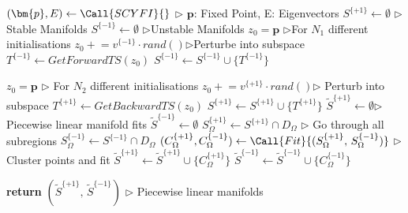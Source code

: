 \documentclass{article}
\theoremstyle{example}
\theoremstyle{plain}
\theoremstyle{definition}
\theoremstyle{remark}
\begin{document}
\begin{algorithm}[h]
\caption{Finding stable/unstable manifolds: fallback algorithm}
\label{alg:fallback}
\begin{algorithmic}[1]
    \State $(\bm{p}, E) \gets \Call{SCYFI}{}$ \hfill $\triangleright$ $\bm{p}$: Fixed Point, E: Eigenvectors
    \State $S^{\{+1\}} \gets \emptyset$ \hfill $\triangleright$Stable Manifolds
    \State $S^{\{-1\}} \gets \emptyset$ \hfill $\triangleright$Unstable Manifolds
    \State $z_0 = \bm{p}$ \hfill $\triangleright$For $N_1$ different initialisations
        \State $z_0 \mathrel{+}= v^{\{-1\}} \cdot rand()$\hfill $\triangleright$Perturbe into subspace
    \EndFor
        \State $T^{\{-1\}} \gets \textit{GetForwardTS}(z_0 )$
        \State $S^{\{-1\}} \gets S^{\{-1\}} \cup \{ T^{\{-1\}} \}$
   
    \EndFor
      \State $z_0 = \bm{p}$ \hfill $\triangleright$ For $N_2$ different initialisations
        \State $z_0 \mathrel{+}= v^{\{+1\}} \cdot rand()$\hfill $\triangleright$ Perturb into subspace
    \EndFor
        \State $T^{\{+1\}} \gets \textit{}{GetBackwardTS}(z_0)$
        \State $S^{\{+1\}} \gets S^{\{+1\}} \cup \{ T^{\{+1\}} \}$
    \EndFor
    \State $\widetilde{S}^{\{+1\}} \gets \emptyset$\hfill \(\triangleright\) Piecewise linear manifold fits
    \State $\widetilde{S}^{\{-1\}} \gets \emptyset$
        \State $S^{\{+1\}}_\Omega \gets S^{\{+1\}} \cap D_{\Omega}$ \hfill \(\triangleright\) Go through all subregions
        \State $S^{\{-1\}}_\Omega \gets S^{\{-1\}} \cap D_{\Omega}$
        \State $(C^{\{+1\}}_{\Omega}, C^{\{-1\}}_{\Omega}) \gets \Call{Fit}{(S^{\{+1\}}_\Omega,\, S^{\{-1\}}_\Omega)}$
        \hfill \(\triangleright\) Cluster points and fit
        \State $\widetilde{S}^{\{+1\}} \gets \widetilde{S}^{\{+1\}} \cup \{C^{\{+1\}}_{\Omega}\}$
        \State $\widetilde{S}^{\{-1\}} \gets \widetilde{S}^{\{-1\}} \cup \{C^{\{-1\}}_{\Omega}\}$
    \EndFor

    \State \textbf{return} $(\widetilde{S}^{\{+1\}},\, \widetilde{S}^{\{-1\}})$ 
    \hfill \(\triangleright\) Piecewise linear manifolds

\end{algorithmic}
\end{algorithm}
\end{document}
